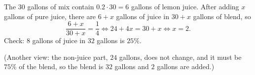 The $30$ gallons of mix contain $0.2\cdot30=6$ gallons of lemon juice. After adding $x$ gallons of pure juice, there are $6+x$ gallons of juice in $30+x$ gallons of blend, so
\[\dfrac{6+x}{30+x}=\dfrac{1}{4}\iff24+4x=30+x\iff x=\boxed{2}.\]
Check: $8$ gallons of juice in $32$ gallons is $25\%$.

(Another view: the non-juice part, $24$ gallons, does not change, and it must be $75\%$ of the blend, so the blend is $32$ gallons and $2$ gallons are added.)
